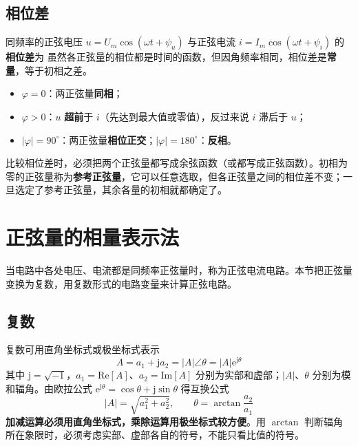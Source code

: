 \subsection{相位差}
同频率的正弦电压 $u=U_m\cos(\omega t+\psi_u)$ 与正弦电流 $i=I_m\cos(\omega t+\psi_i)$ 的\textbf{相位差}为
虽然各正弦量的相位都是时间的函数，但因角频率相同，相位差是\textbf{常量}，等于初相之差。
\begin{itemize}
  \item $\varphi=0$：两正弦量\textbf{同相}；
  \item $\varphi>0$：$u$ \textbf{超前}于 $i$（先达到最大值或零值），反过来说 $i$ 滞后于 $u$；
  \item $|\varphi|=90^\circ$：两正弦量\textbf{相位正交}；$|\varphi|=180^\circ$：\textbf{反相}。
\end{itemize}
比较相位差时，必须把两个正弦量都写成余弦函数（或都写成正弦函数）。初相为零的正弦量称为\textbf{参考正弦量}，它可以任意选取，但各正弦量之间的相位差不变；一旦选定了参考正弦量，其余各量的初相就都确定了。


\section{正弦量的相量表示法}
当电路中各处电压、电流都是同频率正弦量时，称为正弦电流电路。本节把正弦量变换为复数，用复数形式的电路变量来计算正弦电路。

\subsection{复数}
复数可用直角坐标式或极坐标式表示
\begin{equation}
A=a_1+\mathrm{j}a_2=|A|\angle\theta=|A|\mathrm{e}^{\mathrm{j}\theta}
\end{equation}
其中 $\mathrm{j}=\sqrt{-1}$，$a_1=\mathrm{Re}[A]$、$a_2=\mathrm{Im}[A]$ 分别为实部和虚部；$|A|$、$\theta$ 分别为模和辐角。由欧拉公式 $\mathrm{e}^{\mathrm{j}\theta}=\cos\theta+\mathrm{j}\sin\theta$ 得互换公式
\begin{equation}
|A|=\sqrt{a_1^2+a_2^2},\qquad \theta=\arctan\frac{a_2}{a_1}
\end{equation}
\textbf{加减运算必须用直角坐标式，乘除运算用极坐标式较方便}。用 $\arctan$ 判断辐角所在象限时，必须考虑实部、虚部各自的符号，不能只看比值的符号。

